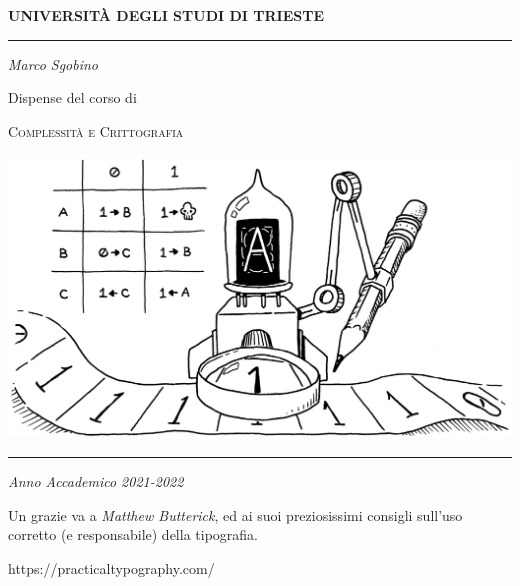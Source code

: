 \begin{titlepage}
        \begin{center}
                \Large
                \textbf{UNIVERSITÀ DEGLI STUDI DI TRIESTE}

                \par\noindent\rule{\textwidth}{0.8pt}
                \vspace*{0.6cm}

                \large
                \emph{Marco Sgobino}

                \large
                \vspace*{0.6cm}

                \Large Dispense del corso di
                \vspace*{0.6cm}

                \Huge
                \textsc{Complessità e Crittografia}
                \vspace*{.1cm}


                \vspace*{2cm}

                \begin{center}
                        \includegraphics[width=.9\textwidth, keepaspectratio]{./pics/turing-machine-titlepage.png}
                \end{center}

                \vfill

                \par\noindent\rule{\textwidth}{0.8pt}
                \vspace*{0.6cm}
                \large
                \emph{Anno Accademico 2021-2022}

                \newpage

                \vspace*{0.5cm}
                \vfill
                \large

                Un grazie va a \emph{Matthew Butterick}, ed ai suoi preziosissimi consigli sull'uso corretto (e responsabile) della tipografia.

                https://practicaltypography.com/

        \end{center}
\end{titlepage}

